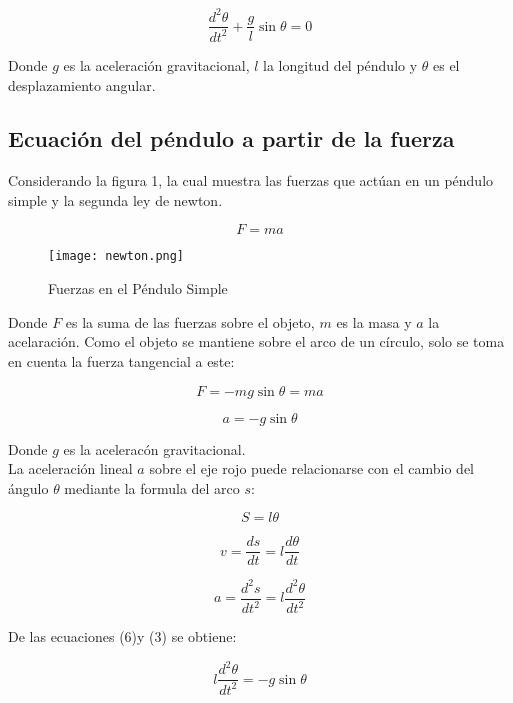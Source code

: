 \documentclass[12pt]{article}
\begin{document}
\begin{equation}
\frac{d^2 \theta}{d t^2}+\frac{g}{l}\sin \theta=0
\end{equation}

Donde $g$ es la aceleración gravitacional, $l$ la longitud del péndulo y $\theta$ es el desplazamiento angular.
 
\subsection{Ecuación del péndulo a partir de la fuerza}

Considerando la figura 1, la cual muestra las fuerzas que actúan en un péndulo simple y la segunda ley de newton.

\begin{equation}
F=ma
\end{equation}

 
\begin{figure}[H]
\centering
\texttt{[image: newton.png]}
\caption{Fuerzas en el Péndulo Simple}
\end{figure}

Donde $F$ es la suma de las fuerzas sobre el objeto, $m$ es la masa y $a$ la acelaración. Como el objeto se mantiene sobre el arco de un círculo, solo se toma en cuenta la fuerza tangencial a este:

\begin{equation}
F=-m g\sin\theta = m a
\end{equation}

$$a= - g \sin \theta$$


Donde $g$ es la aceleracón gravitacional.\\

La aceleración lineal $a$ sobre el eje rojo puede relacionarse con el cambio del ángulo $\theta$ mediante la formula del arco $s$:
 
\begin{equation}
S=l\theta
\end{equation}

\begin{equation}
v=\frac{ds}{dt} = l\frac{d\theta}{dt}
\end{equation}

\begin{equation}
a=\frac{d^2 s}{dt^2} = l\frac{d^2 \theta}{dt^2}
\end{equation}

De las ecuaciones (6)y (3) se obtiene:

\begin{equation}
l\frac{d^2 \theta}{dt^2}= -g\sin \theta
\end{equation}
\end{document}
